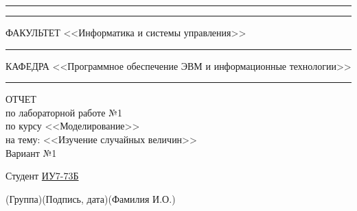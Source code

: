\begin{titlepage}
	\vspace{-2pt}
	\hspace{-34.5pt}\rule{\textwidth}{2.5pt}
	
	\vspace*{-20.3pt}
	\hspace{-34.5pt}\rule{\textwidth}{0.4pt}
	
	\vspace{0.5ex}
	\noindent \small ФАКУЛЬТЕТ\hspace{80pt} <<Информатика и системы управления>>
	
	\vspace*{-16pt}
	\hspace{35pt}\rule{0.855\textwidth}{0.4pt}
	
	\vspace{0.5ex}
	\noindent \small КАФЕДРА\hspace{50pt} <<Программное обеспечение ЭВМ и информационные технологии>>
	
	\vspace*{-16pt}
	\hspace{25pt}\rule{0.875\textwidth}{0.4pt}
	
	
	\vspace{3em}
	
	\begin{center}
		\Large {ОТЧЕТ}\\
		\normalsize по лабораторной работе №1\\
		по курсу <<Моделирование>>\\
		на тему: <<Изучение случайных величин>>\\
		Вариант №1
	\end{center}
	
	\vspace{\fill}
	
	
	\newlength{\ML}
	
	\noindent Студент \underline{\hspace{0.1cm}ИУ7-73Б\hspace{0.1cm}} \hfill \underline{\hspace{4cm}}\quad
	\underline{\hspace{0.4cm}\hspace{0.5cm}}
	
	\vspace{-2.1ex}
	\noindent\hspace{9ex}\scriptsize{(Группа)}\normalsize\hspace{170pt}\hspace{2ex}\scriptsize{(Подпись, дата)}\normalsize\hspace{30pt}\hspace{6ex}\scriptsize{(Фамилия И.О.)}\normalsize
	

\end{titlepage}

